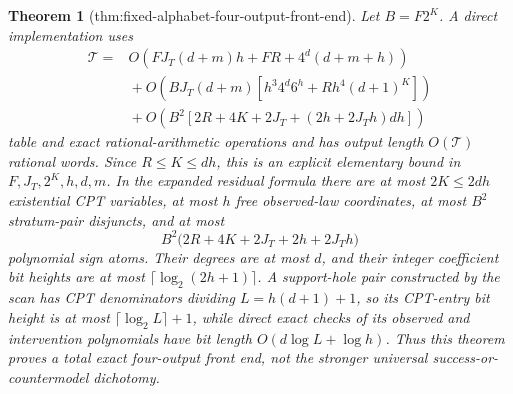 \documentclass{article}
\newtheorem{theorem}{Theorem}
\begin{document}
\begin{theorem}[thm:fixed-alphabet-four-output-front-end]
Let \(B=F2^K\). A direct implementation uses
\[
 \begin{aligned}
 \mathcal T={}&O\!\left(FJ_T(d+m)h+FR+4^d(d+m+h)\right)\\
 &{}+O\!\left(BJ_T(d+m)\left[h^3 4^d6^h+Rh^4(d+1)^K\right]\right)\\
 &{}+O\!\left(B^2\left[2R+4K+2J_T+(2h+2J_Th)dh\right]\right)
 \end{aligned}
\]
table and exact rational-arithmetic operations and has output length \(O(\mathcal T)\) rational words. Since \(R\le K\le dh\), this is an explicit elementary bound in \(F,J_T,2^K,h,d,m\). In the expanded residual formula there are at most \(2K\le2dh\) existential CPT variables, at most \(h\) free observed-law coordinates, at most \(B^2\) stratum-pair disjuncts, and at most
\[
 B^2\bigl(2R+4K+2J_T+2h+2J_Th\bigr)
\]
polynomial sign atoms. Their degrees are at most \(d\), and their integer coefficient bit heights are at most \(\lceil\log_2(2h+1)\rceil\). A support-hole pair constructed by the scan has CPT denominators dividing \(L=h(d+1)+1\), so its CPT-entry bit height is at most \(\lceil\log_2 L\rceil+1\), while direct exact checks of its observed and intervention polynomials have bit length \(O(d\log L+\log h)\). Thus this theorem proves a total exact four-output front end, not the stronger universal success-or-countermodel dichotomy.
\end{theorem}
\end{document}

